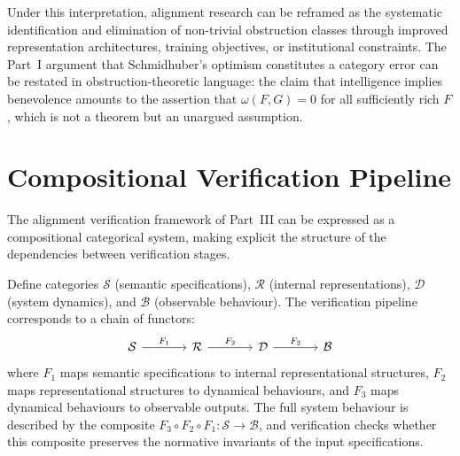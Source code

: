 \documentclass[12pt]{article}
\theoremstyle{definition}
\begin{document}
Under this interpretation, alignment research can be reframed as the systematic
identification and elimination of non-trivial obstruction classes through
improved representation architectures, training objectives, or institutional
constraints. The Part~I argument that Schmidhuber's optimism constitutes a
category error can be restated in obstruction-theoretic language: the claim
that intelligence implies benevolence amounts to the assertion that
$\omega(F, G) = 0$ for all sufficiently rich $F$, which is not a theorem but
an unargued assumption.

\section{Compositional Verification Pipeline}
\label{app:pipeline}

The alignment verification framework of Part~III can be expressed as a
compositional categorical system, making explicit the structure of the
dependencies between verification stages.

Define categories $\mathcal{S}$ (semantic specifications), $\mathcal{R}$
(internal representations), $\mathcal{D}$ (system dynamics), and
$\mathcal{B}$ (observable behaviour). The verification pipeline corresponds
to a chain of functors:
\begin{equation}
\begin{tikzcd}[column sep=large]
\mathcal{S}
  \arrow[r, "F_1"]
& \mathcal{R}
  \arrow[r, "F_2"]
& \mathcal{D}
  \arrow[r, "F_3"]
& \mathcal{B}
\end{tikzcd}
\end{equation}
where $F_1$ maps semantic specifications to internal representational structures,
$F_2$ maps representational structures to dynamical behaviours, and $F_3$ maps
dynamical behaviours to observable outputs. The full system behaviour is
described by the composite $F_3 \circ F_2 \circ F_1 : \mathcal{S} \to
\mathcal{B}$, and verification checks whether this composite preserves the
normative invariants of the input specifications.
\end{document}
